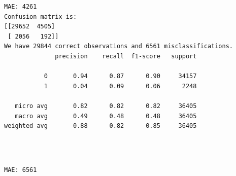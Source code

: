\documentclass[8pt,onecolumn,aps,pra]{revtex4-1}
\begin{document}
    \begin{Verbatim}[commandchars=\\\{\}]
MAE: 4261
Confusion matrix is:
[[29652  4505]
 [ 2056   192]]
We have 29844 correct observations and 6561 misclassifications.
              precision    recall  f1-score   support

           0       0.94      0.87      0.90     34157
           1       0.04      0.09      0.06      2248

   micro avg       0.82      0.82      0.82     36405
   macro avg       0.49      0.48      0.48     36405
weighted avg       0.88      0.82      0.85     36405


    \end{Verbatim}

    \begin{center}
    \end{center}
    { \hspace*{\fill} \\}
    
    \begin{Verbatim}[commandchars=\\\{\}]
MAE: 6561

    \end{Verbatim}
\end{document}
